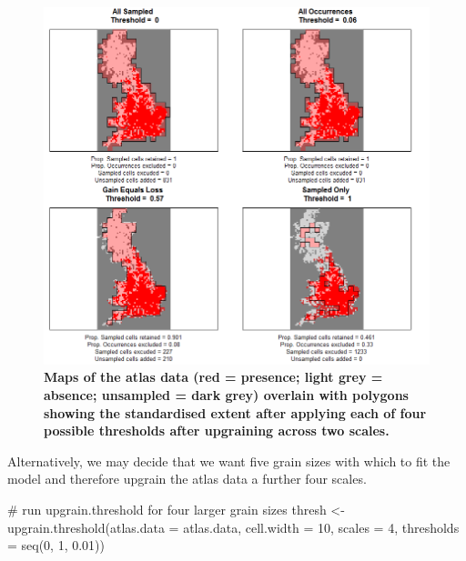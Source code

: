 \documentclass{article}[12pt, a4paper]
\begin{document}
\begin{figure}[ht]
\centering
\includegraphics[width=\linewidth]{Threshold_maps_2_scales.png}
\caption{\textbf{Maps of the atlas data (red = presence; light grey = absence; unsampled = dark grey) overlain with polygons showing the standardised extent after applying each of four possible thresholds after upgraining across two scales.}}
\label{fig:Threshold maps 2}
\end{figure}

Alternatively, we may decide that we want five grain sizes with which to fit the model and therefore upgrain the atlas data a further four scales. 

\begin{Schunk}
\begin{Sinput}
# run upgrain.threshold for four larger grain sizes
thresh <- upgrain.threshold(atlas.data = atlas.data,
                            cell.width = 10,
                            scales = 4,
                            thresholds = seq(0, 1, 0.01))
\end{Sinput}
\end{Schunk}
\end{document}
